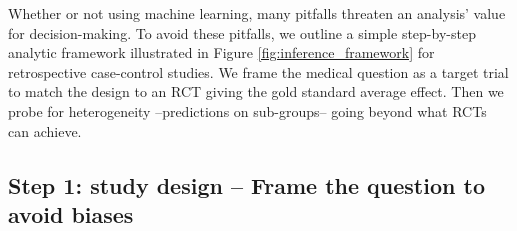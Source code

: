 \documentclass[10pt,letterpaper]{article}
\begin{document}
Whether or not using machine learning, many pitfalls threaten an analysis'
value for decision-making. To avoid these pitfalls, we outline a simple
step-by-step analytic framework illustrated in Figure
\ref{fig:inference_framework} for retrospective case-control studies. We frame
the medical question as a target trial \cite{hernan2021methods} to match the
design to an RCT giving the gold standard average effect. Then we probe for
heterogeneity --predictions on sub-groups--  going beyond what RCTs can
achieve.

\subsection*{Step 1: study design -- Frame the question to avoid biases}\label{sec:framing}


\begin{table}[b!]
  \\
  \caption{PICO(T) components help to clearly define the
    medical question of interest.}\label{table:picot}
\end{table}
\end{document}
